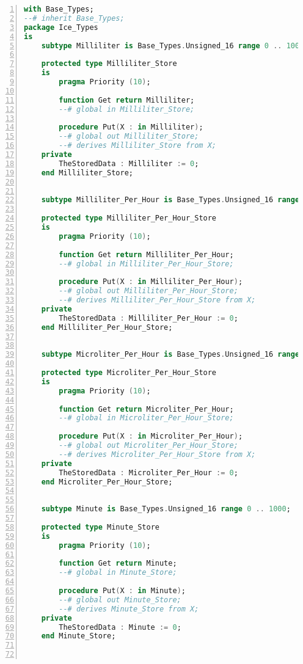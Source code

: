 \singlespacing
\begin{lstlisting}[language=ada, gobble=0, numbers=left, caption={\lstinline{Ice_Types} package}, label={listing:pca_generated:ice_types}]
with Base_Types;
--# inherit Base_Types;
package Ice_Types
is
    subtype Milliliter is Base_Types.Unsigned_16 range 0 .. 1000;

    protected type Milliliter_Store
    is
        pragma Priority (10);

        function Get return Milliliter;
        --# global in Milliliter_Store;

        procedure Put(X : in Milliliter);
        --# global out Milliliter_Store;
        --# derives Milliliter_Store from X;
    private
        TheStoredData : Milliliter := 0;
    end Milliliter_Store;


    subtype Milliliter_Per_Hour is Base_Types.Unsigned_16 range 0 .. 1000;

    protected type Milliliter_Per_Hour_Store
    is
        pragma Priority (10);

        function Get return Milliliter_Per_Hour;
        --# global in Milliliter_Per_Hour_Store;

        procedure Put(X : in Milliliter_Per_Hour);
        --# global out Milliliter_Per_Hour_Store;
        --# derives Milliliter_Per_Hour_Store from X;
    private
        TheStoredData : Milliliter_Per_Hour := 0;
    end Milliliter_Per_Hour_Store;


    subtype Microliter_Per_Hour is Base_Types.Unsigned_16 range 0 .. 1000;

    protected type Microliter_Per_Hour_Store
    is
        pragma Priority (10);

        function Get return Microliter_Per_Hour;
        --# global in Microliter_Per_Hour_Store;

        procedure Put(X : in Microliter_Per_Hour);
        --# global out Microliter_Per_Hour_Store;
        --# derives Microliter_Per_Hour_Store from X;
    private
        TheStoredData : Microliter_Per_Hour := 0;
    end Microliter_Per_Hour_Store;


    subtype Minute is Base_Types.Unsigned_16 range 0 .. 1000;

    protected type Minute_Store
    is
        pragma Priority (10);

        function Get return Minute;
        --# global in Minute_Store;

        procedure Put(X : in Minute);
        --# global out Minute_Store;
        --# derives Minute_Store from X;
    private
        TheStoredData : Minute := 0;
    end Minute_Store;



\end{lstlisting}
